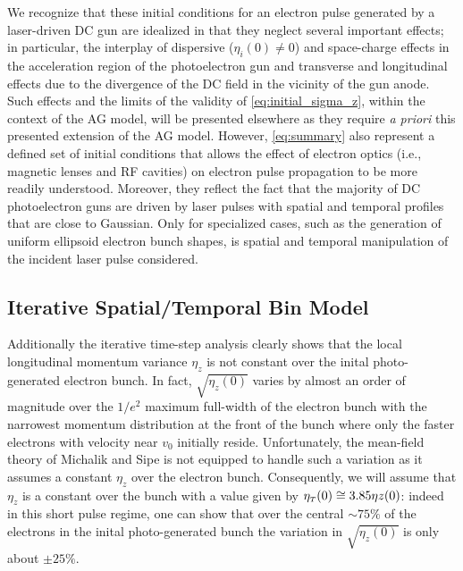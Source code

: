 We recognize that these initial conditions for an electron pulse generated by a laser-driven DC gun are idealized in that they neglect several important effects; in particular, the interplay of dispersive ($ \eta_{i}(0) \neq 0 $) and space-charge effects in the acceleration region of the photoelectron gun and transverse and longitudinal effects due to the divergence of the DC field in the vicinity of the gun anode.\cite{berger_dc_2009,togawa_ceb6_2007}
Such effects and the limits of the validity of \ref{eq:initial_sigma_z}, within the context of the AG model, will be presented elsewhere as they require \textit{a priori} this presented extension of the AG model.
However, \ref{eq:summary} also represent a defined set of initial conditions that allows the effect of electron optics (i.e., magnetic lenses and RF cavities) on electron pulse propagation to be more readily understood.
Moreover, they reflect the fact that the majority of DC photoelectron guns are driven by laser pulses with spatial and temporal profiles that are close to Gaussian.\cite{williamson_clocking_1997,sciaini_electronic_2009}
Only for specialized cases, such as the generation of uniform ellipsoid electron bunch shapes, is spatial and temporal manipulation of the incident laser pulse considered.\cite{luiten_how_2004,li_generating_2008}

\subsection{Iterative Spatial/Temporal Bin Model}

Additionally the iterative time-step analysis clearly shows that the local longitudinal momentum variance $ \eta_{ z } $ is not constant over the inital photo-generated electron bunch.
In fact, $ \sqrt{ \eta_{ z } ( 0 ) } $ varies by almost an order of magnitude over the $ 1/e^{2} $ maximum full-width of the electron bunch with the narrowest momentum distribution at the front of the bunch where only the faster electrons with velocity near $ v_{ 0 } $ initially reside.
Unfortunately, the mean-field theory of Michalik and Sipe \cite{michalik_analytic_2006} is not equipped to handle such a variation as it assumes a constant $ \eta_{ z } $ over the electron bunch.
Consequently, we will assume that $ \eta_{ z } $ is a constant over the bunch with a value given by $ \eta_{{\scriptscriptstyle T} } ( 0 ) \cong 3.85 \eta{ z } ( 0 ) $: %
indeed in this short pulse regime, one can show that over the central $ \sim 75 \% $ of the electrons in the inital photo-generated bunch the variation in $ \sqrt{ \eta_{ z } ( 0 ) } $ is only about $ \pm 25 \% $.


